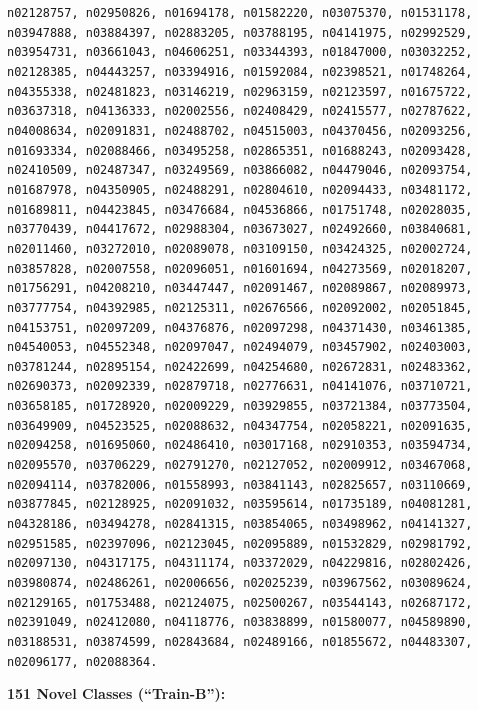 {\tt n02128757, n02950826, n01694178, n01582220, n03075370, n01531178, n03947888, n03884397, n02883205, n03788195, n04141975, n02992529, n03954731, n03661043, n04606251, n03344393, n01847000, n03032252, n02128385, n04443257, n03394916, n01592084, n02398521, n01748264, n04355338, n02481823, n03146219, n02963159, n02123597, n01675722, n03637318, n04136333, n02002556, n02408429, n02415577, n02787622, n04008634, n02091831, n02488702, n04515003, n04370456, n02093256, n01693334, n02088466, n03495258, n02865351, n01688243, n02093428, n02410509, n02487347, n03249569, n03866082, n04479046, n02093754, n01687978, n04350905, n02488291, n02804610, n02094433, n03481172, n01689811, n04423845, n03476684, n04536866, n01751748, n02028035, n03770439, n04417672, n02988304, n03673027, n02492660, n03840681, n02011460, n03272010, n02089078, n03109150, n03424325, n02002724, n03857828, n02007558, n02096051, n01601694, n04273569, n02018207, n01756291, n04208210, n03447447, n02091467, n02089867, n02089973, n03777754, n04392985, n02125311, n02676566, n02092002, n02051845, n04153751, n02097209, n04376876, n02097298, n04371430, n03461385, n04540053, n04552348, n02097047, n02494079, n03457902, n02403003, n03781244, n02895154, n02422699, n04254680, n02672831, n02483362, n02690373, n02092339, n02879718, n02776631, n04141076, n03710721, n03658185, n01728920, n02009229, n03929855, n03721384, n03773504, n03649909, n04523525, n02088632, n04347754, n02058221, n02091635, n02094258, n01695060, n02486410, n03017168, n02910353, n03594734, n02095570, n03706229, n02791270, n02127052, n02009912, n03467068, n02094114, n03782006, n01558993, n03841143, n02825657, n03110669, n03877845, n02128925, n02091032, n03595614, n01735189, n04081281, n04328186, n03494278, n02841315, n03854065, n03498962, n04141327, n02951585, n02397096, n02123045, n02095889, n01532829, n02981792, n02097130, n04317175, n04311174, n03372029, n04229816, n02802426, n03980874, n02486261, n02006656, n02025239, n03967562, n03089624, n02129165, n01753488, n02124075, n02500267, n03544143, n02687172, n02391049, n02412080, n04118776, n03838899, n01580077, n04589890, n03188531, n03874599, n02843684, n02489166, n01855672, n04483307, n02096177, n02088364.}

{\bf 151 Novel Classes (``Train-B''):}

